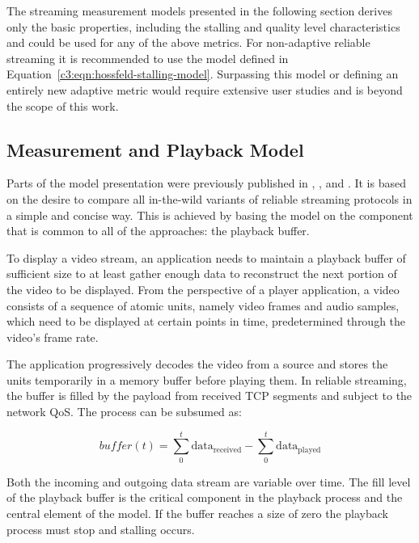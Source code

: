 The streaming measurement models presented in the following section derives only the basic properties, including the stalling and quality level characteristics and could be used for any of the above metrics. For non-adaptive reliable streaming it is recommended to use the model defined in Equation~\ref{c3:eqn:hossfeld-stalling-model}. Surpassing this model or defining an entirely new adaptive metric would require extensive user studies and is beyond the scope of this work.

\subsection{Measurement and Playback Model}
\label{c3:sec:model}

Parts of the model presentation were previously published in \cite{cs3518}, \cite{metzger2011delivery}, and \cite{6229739}. It is based on the desire to compare all in-the-wild variants of reliable streaming protocols in a simple and concise way. This is achieved by basing the model on the component that is common to all of the approaches: the playback buffer.

To display a video stream, an application needs to maintain a playback buffer of sufficient size to at least gather enough data to reconstruct the next portion of the video to be displayed. From the perspective of a player application, a video consists of a sequence of atomic units, namely video frames and audio samples, which need to be displayed at certain points in time, predetermined through the video's frame rate. 

The application progressively decodes the video from a source and stores the units temporarily in a memory buffer before playing them. In reliable streaming, the buffer is filled by the payload from received \gls{TCP} segments and subject to the network \gls{QoS}. The process can be subsumed as:

\begin{equation*}
	\mathit{buffer}(t) = \sum_{0}^{t} \text{data}_\mathrm{received} - \sum_{0}^{t} \text{data}_\mathrm{played}
\end{equation*}

Both the incoming and outgoing data stream are variable over time. The fill level of the playback buffer is the critical component in the playback process and the central element of the model. If the buffer reaches a size of zero the playback process must stop and stalling occurs.

